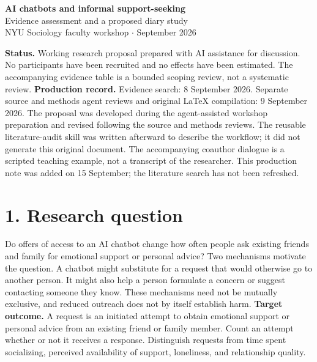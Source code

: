 \documentclass[11pt]{article}
\begin{document}
\begin{center}
{\Large\bfseries AI chatbots and informal support-seeking}\\[8pt]
{\large Evidence assessment and a proposed diary study}\\[8pt]
NYU Sociology faculty workshop $\cdot$ September 2026
\end{center}
\textbf{Status.} Working research proposal prepared with AI assistance for discussion. No participants have been recruited and no effects have been estimated. The accompanying evidence table is a bounded scoping review, not a systematic review.
{\small\textbf{Production record.} Evidence search: 8 September 2026. Separate source and methods agent reviews and original LaTeX compilation: 9 September 2026. The proposal was developed during the agent-assisted workshop preparation and revised following the source and methods reviews. The reusable literature-audit skill was written afterward to describe the workflow; it did not generate this original document. The accompanying coauthor dialogue is a scripted teaching example, not a transcript of the researcher. This production note was added on 15 September; the literature search has not been refreshed.}
\section*{1. Research question}
Do offers of access to an AI chatbot change how often people ask existing friends and family for emotional support or personal advice? Two mechanisms motivate the question. A chatbot might substitute for a request that would otherwise go to another person. It might also help a person formulate a concern or suggest contacting someone they know. These mechanisms need not be mutually exclusive, and reduced outreach does not by itself establish harm.
\textbf{Target outcome.} A request is an initiated attempt to obtain emotional support or personal advice from an existing friend or family member. Count an attempt whether or not it receives a response. Distinguish requests from time spent socializing, perceived availability of support, loneliness, and relationship quality.
\end{document}
